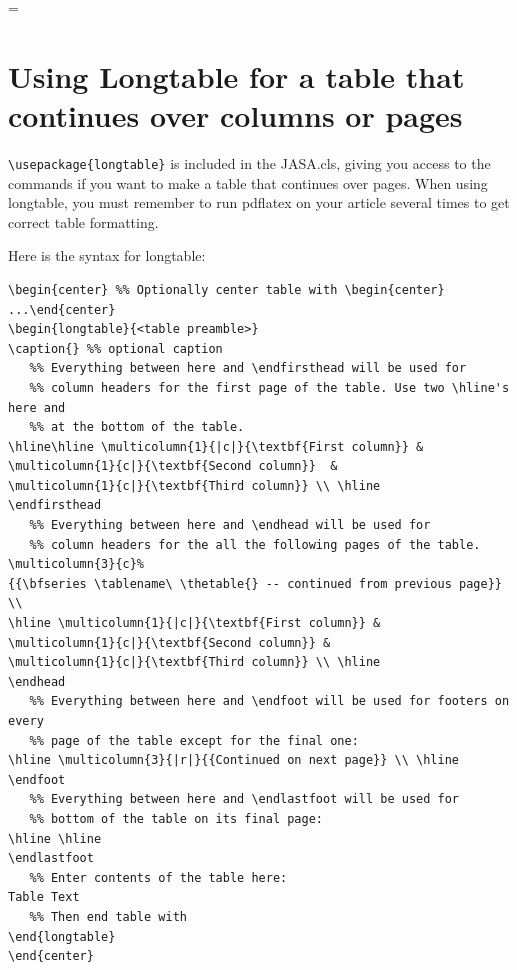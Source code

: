 \documentclass[reprint]{JASA}
\begin{document}
{
\hsize=\textwidth

 \section{Using Longtable for a table that continues over columns or
pages}
\verb+\usepackage{longtable}+ is included in the JASA.cls, giving you 
access to the commands if you want to make a table that continues
over pages. When using longtable, you must remember to run pdflatex on your article
several times to get correct table formatting.

Here is the syntax for longtable:

\vskip-36pt
{\baselineskip=15pt
\begin{verbatim}
\begin{center} %% Optionally center table with \begin{center} ...\end{center}
\begin{longtable}{<table preamble>}
\caption{} %% optional caption
   %% Everything between here and \endfirsthead will be used for
   %% column headers for the first page of the table. Use two \hline's here and 
   %% at the bottom of the table.
\hline\hline \multicolumn{1}{|c|}{\textbf{First column}} &
\multicolumn{1}{c|}{\textbf{Second column}}  &
\multicolumn{1}{c|}{\textbf{Third column}} \\ \hline 
\endfirsthead
   %% Everything between here and \endhead will be used for
   %% column headers for the all the following pages of the table.
\multicolumn{3}{c}%
{{\bfseries \tablename\ \thetable{} -- continued from previous page}} \\
\hline \multicolumn{1}{|c|}{\textbf{First column}} & 
\multicolumn{1}{c|}{\textbf{Second column}} & 
\multicolumn{1}{c|}{\textbf{Third column}} \\ \hline 
\endhead
   %% Everything between here and \endfoot will be used for footers on every
   %% page of the table except for the final one:
\hline \multicolumn{3}{|r|}{{Continued on next page}} \\ \hline
\endfoot
   %% Everything between here and \endlastfoot will be used for 
   %% bottom of the table on its final page:
\hline \hline
\endlastfoot
   %% Enter contents of the table here:
Table Text
   %% Then end table with
\end{longtable}
\end{center}
\end{verbatim}
}}
\end{document}
